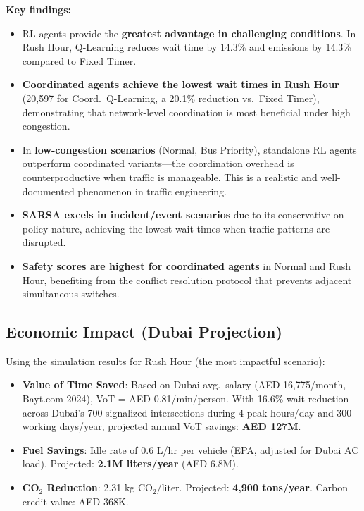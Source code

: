 \documentclass[12pt, a4paper]{article}
\begin{document}
\textbf{Key findings:}
\begin{itemize}[nosep]
    \item RL agents provide the \textbf{greatest advantage in challenging conditions}. In Rush Hour, Q-Learning reduces wait time by 14.3\% and emissions by 14.3\% compared to Fixed Timer.
    \item \textbf{Coordinated agents achieve the lowest wait times in Rush Hour} (20,597 for Coord.\ Q-Learning, a 20.1\% reduction vs.\ Fixed Timer), demonstrating that network-level coordination is most beneficial under high congestion.
    \item In \textbf{low-congestion scenarios} (Normal, Bus Priority), standalone RL agents outperform coordinated variants---the coordination overhead is counterproductive when traffic is manageable. This is a realistic and well-documented phenomenon in traffic engineering.
    \item \textbf{SARSA excels in incident/event scenarios} due to its conservative on-policy nature, achieving the lowest wait times when traffic patterns are disrupted.
    \item \textbf{Safety scores are highest for coordinated agents} in Normal and Rush Hour, benefiting from the conflict resolution protocol that prevents adjacent simultaneous switches.
\end{itemize}

\subsection{Economic Impact (Dubai Projection)}

Using the simulation results for Rush Hour (the most impactful scenario):
\begin{itemize}[nosep]
    \item \textbf{Value of Time Saved}: Based on Dubai avg.\ salary (AED 16,775/month, Bayt.com 2024), VoT = AED 0.81/min/person. With 16.6\% wait reduction across Dubai's 700 signalized intersections during 4 peak hours/day and 300 working days/year, projected annual VoT savings: \textbf{AED 127M}.
    \item \textbf{Fuel Savings}: Idle rate of 0.6 L/hr per vehicle (EPA, adjusted for Dubai AC load). Projected: \textbf{2.1M liters/year} (AED 6.8M).
    \item \textbf{CO$_2$ Reduction}: 2.31 kg CO$_2$/liter. Projected: \textbf{4,900 tons/year}. Carbon credit value: AED 368K.
\end{itemize}
\end{document}
